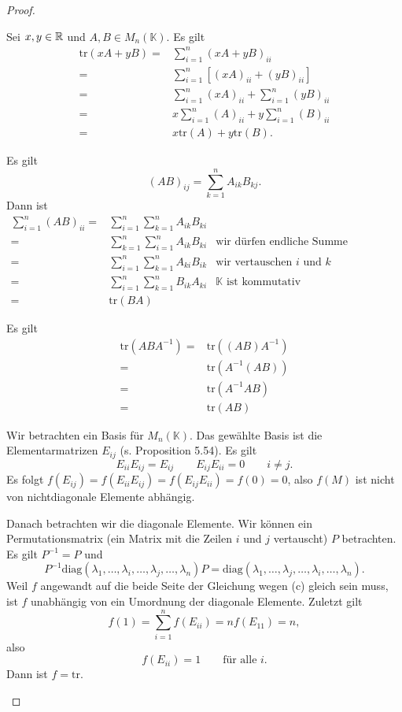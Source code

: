 \begin{proof}
	\begin{parts}
	\item Sei $x,y\in \mathbb{R}$ und $A,B\in M_n(\mathbb{K})$. Es gilt
		\begin{align*}
			\text{tr}(xA+yB)=&\sum_{i=1}^n\left( xA+yB \right)_{ii}\\
			=& \sum_{i=1}^n \left[ (xA)_{ii}+(yB)_{ii} \right] \\
			=&\sum_{i=1}^n \left( xA \right)_{ii}+\sum_{i=1}^n \left( yB \right)_{ii}\\
			=& x\sum_{i=1}^n (A)_{ii}+y\sum_{i=1}^n (B)_{ii}\\
			=&x\text{tr}(A)+y\text{tr}(B).
		\end{align*}
	\item Es gilt
		\[
			(AB)_{ij}=\sum_{k=1}^n A_{ik}B_{kj}
		.\] 
		Dann ist
		\begin{align*}
			\sum_{i=1}^n (AB)_{ii}=&\sum_{i=1}^n\sum_{k=1}^n A_{ik}B_{ki}\\
			=&\sum_{k=1}^n\sum_{i=1}^n A_{ik}B_{ki} & \text{wir dürfen endliche Summe umordnen}\\
			=&\sum_{i=1}^n\sum_{k=1}^n A_{ki}B_{ik} & \text{wir vertauschen }i\text{ und }k\\
			=&\sum_{i=1}^n\sum_{k=1}^n B_{ik}A_{ki} & \mathbb{K}\text{ ist kommutativ}\\
			=&\text{tr}(BA)
		\end{align*}
	\item Es gilt
		\begin{align*}
			\text{tr}(ABA^{-1})=&\text{tr}\left( (AB)A^{-1} \right) \\
			=&\text{tr}\left( A^{-1}(AB) \right) \\
			=& \text{tr}(A^{-1}AB)\\
			=&\text{tr}(AB)
		\end{align*}
	\item Wir betrachten ein Basis f\"{u}r $M_n(\mathbb{K})$. Das gewählte Basis ist die Elementarmatrizen $E_{ij}$ (s. Proposition 5.54). Es gilt
		\[
			E_{ii}E_{ij}=E_{ij}\qquad E_{ij}E_{ii}=0\qquad i\neq j
		.\] 
		Es folgt $f(E_{ij})=f(E_{ii}E_{ij})=f(E_{ij}E_{ii})=f(0)=0$, also $f(M)$ ist nicht von nichtdiagonale Elemente abhängig. 

		Danach betrachten wir die diagonale Elemente. Wir können ein Permutationsmatrix (ein Matrix mit die Zeilen $i$ und $j$ vertauscht) $P$ betrachten. Es gilt $P^{-1}=P$ und
	\[
		P^{-1}\text{diag}(\lambda_1,\dots,\lambda_i,\dots,\lambda_j,\dots,\lambda_n)P=\text{diag}(\lambda_1,\dots,\lambda_j,\dots,\lambda_i,\dots,\lambda_n)
	.\] 
	Weil $f$ angewandt auf die beide Seite der Gleichung wegen (c) gleich sein muss, ist $f$ unabhängig von ein Umordnung der diagonale Elemente. Zuletzt gilt
	\[
		f(1)=\sum_{i=1}^n f(E_{ii})=nf(E_{11})=n
	,\] 
	also
	\[
		f(E_{ii})=1\qquad\text{f\"{u}r alle }i
	.\] 
	Dann ist $f=\text{tr}$.\qedhere
	\end{parts}
\end{proof}
